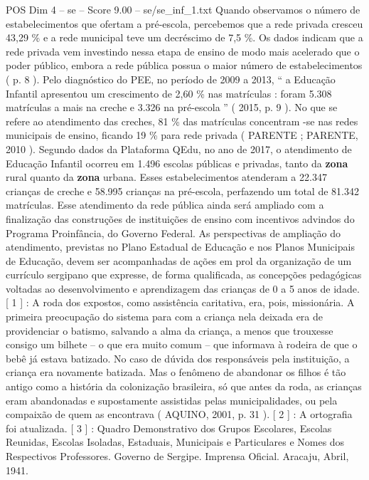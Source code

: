 \begin{textsample}{POS Dim 4 – se – Score 9.00 – se/se\_inf\_1.txt}
Quando observamos o número de estabelecimentos que ofertam a pré-escola, percebemos que a rede privada cresceu 43,29 \% e a rede municipal teve um decréscimo de 7,5 \%.
Os dados indicam que a rede privada vem investindo nessa etapa de ensino de modo mais acelerado que o poder público, embora a rede pública possua o maior número de estabelecimentos ( p. 8 ).
Pelo diagnóstico do PEE, no período de 2009 a 2013, “ a Educação Infantil apresentou um crescimento de 2,60 \% nas matrículas : foram 5.308 matrículas a mais na creche e 3.326 na pré-escola ” ( 2015, p. 9 ).
No que se refere ao atendimento das creches, 81 \% das matrículas concentram -se nas redes municipais de ensino, ficando 19 \% para rede privada ( PARENTE ; PARENTE, 2010 ).
Segundo dados da Plataforma QEdu, no ano de 2017, o atendimento de Educação Infantil ocorreu em 1.496 escolas públicas e privadas, tanto da \textbf{zona} rural quanto da \textbf{zona} urbana.
Esses estabelecimentos atenderam a 22.347 crianças de creche e 58.995 crianças na pré-escola, perfazendo um total de 81.342 matrículas.
Esse atendimento da rede pública ainda será ampliado com a finalização das construções de instituições de ensino com incentivos advindos do Programa Proinfância, do Governo Federal.
As perspectivas de ampliação do atendimento, previstas no Plano Estadual de Educação e nos Planos Municipais de Educação, devem ser acompanhadas de ações em prol da organização de um currículo sergipano que expresse, de forma qualificada, as concepções pedagógicas voltadas ao desenvolvimento e aprendizagem das crianças de 0 a 5 anos de idade. [ 1 ] : A roda dos expostos, como assistência caritativa, era, pois, missionária.
A primeira preocupação do sistema para com a criança nela deixada era de providenciar o batismo, salvando a alma da criança, a menos que trouxesse consigo um bilhete – o que era muito comum – que informava à rodeira de que o bebê já estava batizado.
No caso de dúvida dos responsáveis pela instituição, a criança era novamente batizada.
Mas o fenômeno de abandonar os filhos é tão antigo como a história da colonização brasileira, só que antes da roda, as crianças eram abandonadas e supostamente assistidas pelas municipalidades, ou pela compaixão de quem as encontrava ( AQUINO, 2001, p. 31 ). [ 2 ] : A ortografia foi atualizada. [ 3 ] : Quadro Demonstrativo dos Grupos Escolares, Escolas Reunidas, Escolas Isoladas, Estaduais, Municipais e Particulares e Nomes dos Respectivos Professores.
Governo de Sergipe.
Imprensa Oficial.
Aracaju, Abril, 1941.

\end{textsample}
